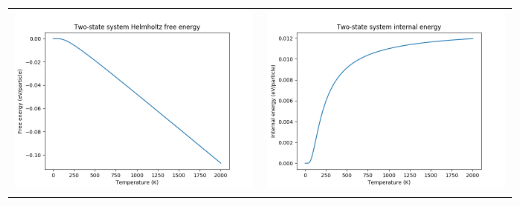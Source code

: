 \documentclass[11pt]{article}
\begin{document}
\begin{table}
\begin{tabular}{cc}
\includegraphics[scale=0.5]{Images/2state-helmholtz.png} & \includegraphics[scale=0.5]{Images/2state-internal.png} \\

\end{tabular}
\end{table}
\end{document}
